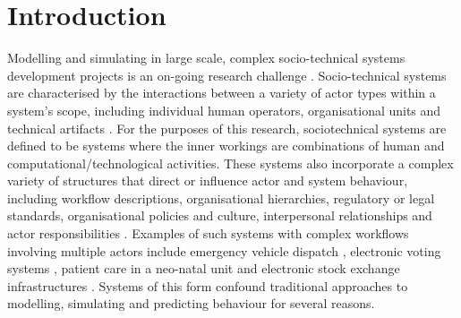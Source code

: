 \documentclass{sig-alternate}
\begin{document}

\section{Introduction}
\label{sec:introduction}


Modelling and simulating in large scale, complex socio-technical systems
development projects is an on-going research challenge \citep{baxter08learning}.
Socio-technical systems are characterised by the interactions between a variety
of actor types within a system's scope, including individual human operators,
organisational units and technical artifacts
\citep{Susman1976,elhassan07role,sommerville08socio}. For the purposes of this
research, sociotechnical systems are defined to be systems where the inner workings 
are combinations of human and computational/technological activities. These systems 
also incorporate a complex variety of structures that direct or influence actor
and system behaviour, including workflow descriptions, organisational
hierarchies, regulatory or legal standards, organisational policies and culture,
interpersonal relationships and actor responsibilities
\citep{bade07structures,pentland05organisational}. Examples of such systems with
complex workflows involving multiple actors include emergency vehicle dispatch
\citep{robinson96limited}, electronic voting systems
\citep{bryans04towards,lock07observations}, patient care in a neo-natal unit
\citep{baxter07evaluating} and electronic stock exchange infrastructures
\citep{cftc-sec10findings}.  Systems of this form confound traditional
approaches to modelling, simulating and predicting behaviour for several
reasons.
\end{document}
